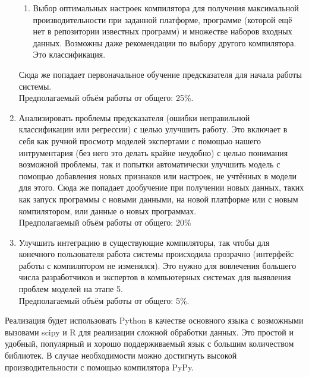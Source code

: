 \begin{enumerate}
{\begin{enumerate}
	\item Выбор оптимальных настроек компилятора для получения максимальной производительности при заданной платформе, программе (которой ещё нет в репозитории известных программ) и множестве наборов входных данных. Возможны даже рекомендации по выбору другого компилятора. Это классификация.
	\end{enumerate}
Сюда же попадает первоначальное обучение предсказателя для начала работы системы.\\
Предполагаемый объём работы от общего: 25\%.}
\item {Анализировать проблемы предсказателя (ошибки неправильной классификации или регрессии) с целью улучшить работу.
Это включает в себя как ручной просмотр моделей экспертами с помощью нашего интрументария (без него это делать крайне неудобно) с целью понимания возможной проблемы, так и попытки автоматически улучшить модель с помощью добавления новых признаков или настроек, не учтённых в модели для этого.
Сюда же попадает дообучение при получении новых данных, таких как запуск программы с новыми данными, на новой платформе или с новым компилятором, или данные о новых программах.\\
Предполагаемый объём работы от общего: 20\%}
\item {Улучшить интеграцию в существующие компиляторы, так чтобы для конечного пользователя работа системы происходила прозрачно (интерфейс работы с компилятором не изменялся). Это нужно для вовлечения большего числа разработчиков и экспертов в компьютерных системах для выявления проблем моделей на этапе 5.\\
Предполагаемый объём работы от общего: 5\%.}
\end{enumerate}

Реализация будет использовать Python в качестве основного языка с возможными вызовами scipy и R для реализации сложной обработки данных. Это простой и удобный, популярный и хорошо поддерживаемый язык с большим количеством библиотек. В случае необходимости можно достигнуть высокой производительности с помощью компилятора PyPy.